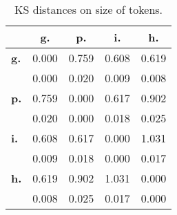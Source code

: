 \begin{table}[h!]
\begin{center}
\begin{tabular}{| l || c | c | c | c |}\hline
 & {\bf g.} & {\bf p.} & {\bf i.} & {\bf h.} \\\hline\hline
{\bf g.} & 0.000 & 0.759 & 0.608 & 0.619 \\
{\bf } & 0.000 & 0.020 & 0.009 & 0.008 \\\hline
{\bf p.} & 0.759 & 0.000 & 0.617 & 0.902 \\
{\bf } & 0.020 & 0.000 & 0.018 & 0.025 \\\hline
{\bf i.} & 0.608 & 0.617 & 0.000 & 1.031 \\
{\bf } & 0.009 & 0.018 & 0.000 & 0.017 \\\hline
{\bf h.} & 0.619 & 0.902 & 1.031 & 0.000 \\
{\bf } & 0.008 & 0.025 & 0.017 & 0.000 \\\hline
\end{tabular}
\caption{KS distances on size of tokens.}
\end{center}
\end{table}